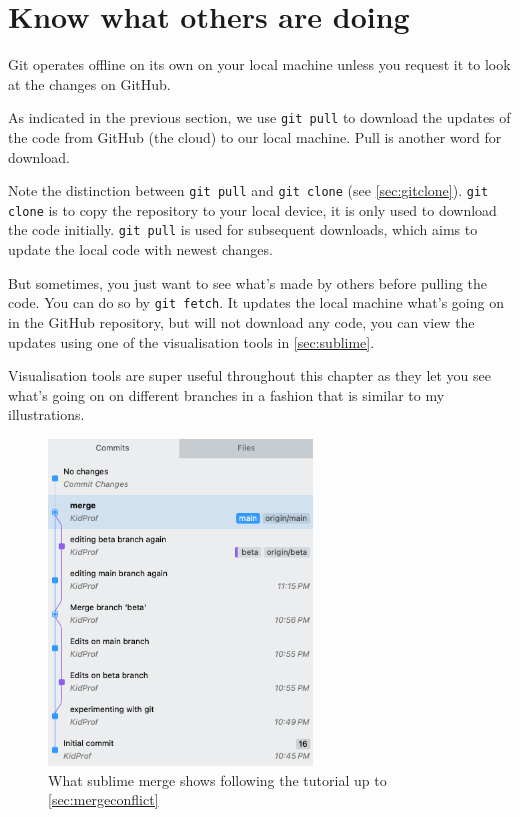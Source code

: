 \section{Know what others are doing}
\label{sec:gitpull}

Git operates offline on its own on your local machine unless you request it to look at the changes on GitHub.

As indicated in the previous section, we use \texttt{git pull} to download the updates of the code from GitHub (the cloud) to our local machine. Pull is another word for download.

Note the distinction between \texttt{git pull} and \texttt{git clone} (see \cref{sec:gitclone}). \texttt{git clone} is to copy the repository to your local device, it is only used to download the code initially. \texttt{git pull} is used for subsequent downloads, which aims to update the local code with newest changes.

But sometimes, you just want to see what's made by others before pulling the code. You can do so by \texttt{git fetch}. It updates the local machine what's going on in the GitHub repository, but will not download any code, you can view the updates using one of the visualisation tools in \cref{sec:sublime}.

Visualisation tools are super useful throughout this chapter as they let you see what's going on on different branches in a fashion that is similar to my illustrations.

\begin{figure}[h]
\centering
\includegraphics[width=7cm]{images/ch8-sublimemerge.png}
\caption{What sublime merge shows following the tutorial up to \cref{sec:mergeconflict}}
\end{figure}

